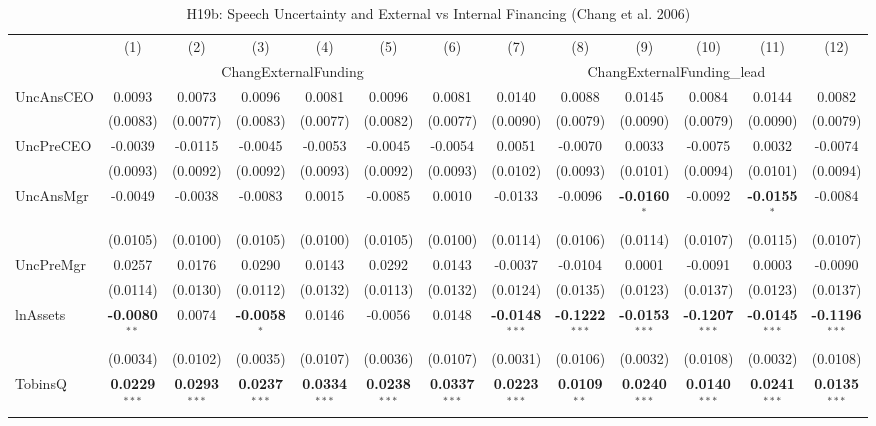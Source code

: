 \begin{landscape}
\begin{table}[H]
\setlength{\tabcolsep}{3pt}
\renewcommand{\arraystretch}{0.85}
\centering
\caption{H19b: Speech Uncertainty and External vs Internal Financing (Chang et al. 2006)}
\label{tab:h19b}
\scriptsize
\begin{tabular}{lcccccccccccc}
\toprule
 & (1) & (2) & (3) & (4) & (5) & (6) & (7) & (8) & (9) & (10) & (11) & (12) \\
 & \multicolumn{6}{c}{ChangExternalFunding} & \multicolumn{6}{c}{ChangExternalFunding\_lead} \\
\cmidrule(lr){2-7} \cmidrule(lr){8-13}
\midrule
UncAnsCEO & 0.0093 & 0.0073 & 0.0096 & 0.0081 & 0.0096 & 0.0081 & 0.0140 & 0.0088 & 0.0145 & 0.0084 & 0.0144 & 0.0082 \\
 & (0.0083) & (0.0077) & (0.0083) & (0.0077) & (0.0082) & (0.0077) & (0.0090) & (0.0079) & (0.0090) & (0.0079) & (0.0090) & (0.0079) \\
UncPreCEO & -0.0039 & -0.0115 & -0.0045 & -0.0053 & -0.0045 & -0.0054 & 0.0051 & -0.0070 & 0.0033 & -0.0075 & 0.0032 & -0.0074 \\
 & (0.0093) & (0.0092) & (0.0092) & (0.0093) & (0.0092) & (0.0093) & (0.0102) & (0.0093) & (0.0101) & (0.0094) & (0.0101) & (0.0094) \\
UncAnsMgr & -0.0049 & -0.0038 & -0.0083 & 0.0015 & -0.0085 & 0.0010 & -0.0133 & -0.0096 & \textbf{-0.0160}$^{*}$ & -0.0092 & \textbf{-0.0155}$^{*}$ & -0.0084 \\
 & (0.0105) & (0.0100) & (0.0105) & (0.0100) & (0.0105) & (0.0100) & (0.0114) & (0.0106) & (0.0114) & (0.0107) & (0.0115) & (0.0107) \\
UncPreMgr & 0.0257 & 0.0176 & 0.0290 & 0.0143 & 0.0292 & 0.0143 & -0.0037 & -0.0104 & 0.0001 & -0.0091 & 0.0003 & -0.0090 \\
 & (0.0114) & (0.0130) & (0.0112) & (0.0132) & (0.0113) & (0.0132) & (0.0124) & (0.0135) & (0.0123) & (0.0137) & (0.0123) & (0.0137) \\
\midrule
lnAssets & \textbf{-0.0080}$^{**}$ & 0.0074 & \textbf{-0.0058}$^{*}$ & 0.0146 & -0.0056 & 0.0148 & \textbf{-0.0148}$^{***}$ & \textbf{-0.1222}$^{***}$ & \textbf{-0.0153}$^{***}$ & \textbf{-0.1207}$^{***}$ & \textbf{-0.0145}$^{***}$ & \textbf{-0.1196}$^{***}$ \\
 & (0.0034) & (0.0102) & (0.0035) & (0.0107) & (0.0036) & (0.0107) & (0.0031) & (0.0106) & (0.0032) & (0.0108) & (0.0032) & (0.0108) \\
TobinsQ & \textbf{0.0229}$^{***}$ & \textbf{0.0293}$^{***}$ & \textbf{0.0237}$^{***}$ & \textbf{0.0334}$^{***}$ & \textbf{0.0238}$^{***}$ & \textbf{0.0337}$^{***}$ & \textbf{0.0223}$^{***}$ & \textbf{0.0109}$^{**}$ & \textbf{0.0240}$^{***}$ & \textbf{0.0140}$^{***}$ & \textbf{0.0241}$^{***}$ & \textbf{0.0135}$^{***}$ \\

\end{tabular}
\end{table}
\end{landscape}
